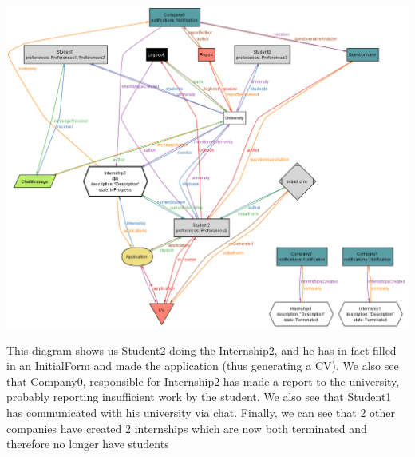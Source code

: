 \begin{enumerate}[label=,leftmargin=0cm]
\begin{lstlisting}[language=alloy]
          \end{lstlisting}

            \begin{adjustbox}{max size={\textwidth}{\textheight}}
                  \includegraphics{RASD/alloy/alloy2.png}
            \end{adjustbox}

            This diagram shows us Student2 doing the Internship2, and he has in fact filled in an InitialForm and made the application (thus generating a CV). We also see that Company0, responsible for Internship2 has made a report to the university, probably reporting insufficient work by the student. We also see that Student1 has communicated with his university via chat. Finally, we can see that 2 other companies have created 2 internships which are now both terminated and therefore no longer have students
\end{enumerate}